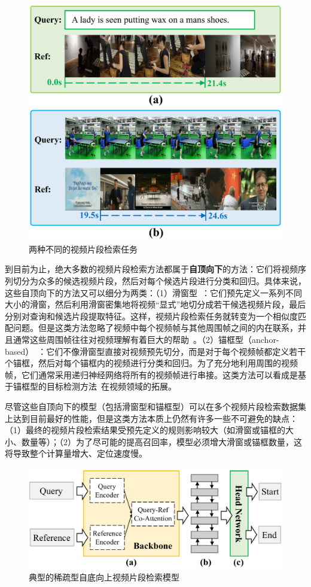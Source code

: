 \begin{figure}[t]
    \centering
    \includegraphics[width=0.8\linewidth]{chapter6/res/qbvl.pdf}
    \caption{两种不同的视频片段检索任务}
    \label{ch6:fig:qbvl}
\end{figure}

到目前为止，绝大多数的视频片段检索方法都属于\textbf{自顶向下}的方法：它们将视频序列切分为众多的候选视频片段，然后对每个候选片段进行分类和回归。具体来说，这些自顶向下的方法又可以细分为两类：（1）滑窗型~\cite{gao2017tall,anne2017localizing,liu2018attentive,liu2018cross,ge2019mac,chen2019semantic,xu2019multilevel,zhang2019exploiting}：它们预先定义一系列不同大小的滑窗，然后利用滑窗密集地将视频“显式”地切分成若干候选视频片段，最后分别对查询和候选片段提取特征。这样，视频片段检索任务就转变为一个相似度匹配问题。但是这类方法忽略了视频中每个视频帧与其他周围帧之间的内在联系，并且通常这些周围帧往往对视频理解有着巨大的帮助~\cite{wu2019long}。（2）锚框型（anchor-based）~\cite{chen2018temporally,zhang2019man}：它们不像滑窗型直接对视频预先切分，而是对于每个视频帧都定义若干个锚框，然后对每个锚框内的视频进行分类和回归。为了充分地利用周围的视频帧，它们通常采用递归神经网络将所有的视频帧进行串接。这类方法可以看成是基于锚框型的目标检测方法~\cite{ren2015faster}在视频领域的拓展。

尽管这些自顶向下的模型（包括滑窗型和锚框型）可以在多个视频片段检索数据集上达到目前最好的性能，但是这类方法本质上仍然有许多一些不可避免的缺点：（1）最终的视频片段检索结果受预先定义的规则影响较大（如滑窗或锚框的大小、数量等）；（2）为了尽可能的提高召回率，模型必须增大滑窗或锚框数量，这将导致整个计算量增大、定位速度慢。


\begin{figure}[t]
    \centering
    \includegraphics[width=0.8\linewidth]{chapter6/res/sparse_bu.pdf}
    \caption{典型的稀疏型自底向上视频片段检索模型}
    \label{ch6:fig:sparse_bu}
\end{figure}


